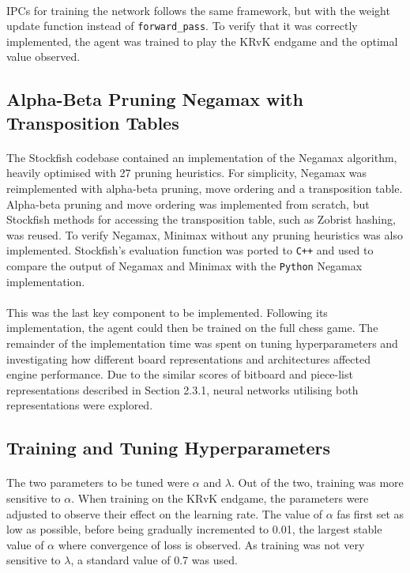 \documentclass[12pt,a4paper]{book}
\begin{document}
\paragraph{} IPCs for training the network follows the same framework, but with the weight update function instead of \texttt{forward\_pass}. To verify that it was correctly implemented, the agent was trained to play the KRvK endgame and the optimal value observed.

\subsection{Alpha-Beta Pruning Negamax with Transposition Tables}

\paragraph{} The Stockfish codebase contained an implementation of the Negamax algorithm, heavily optimised with 27 pruning heuristics. For simplicity, Negamax was reimplemented with alpha-beta pruning, move ordering and a transposition table. Alpha-beta pruning and move ordering was implemented from scratch, but Stockfish methods for accessing the transposition table, such as Zobrist hashing, was reused. To verify Negamax, Minimax without any pruning heuristics was also implemented. Stockfish's evaluation function was ported to \texttt{C++} and used to compare the output of Negamax and Minimax with the \texttt{Python} Negamax implementation.

\paragraph{} This was the last key component to be implemented. Following its implementation, the agent could then be trained on the full chess game. The remainder of the implementation time was spent on tuning hyperparameters and investigating how different board representations and architectures affected engine performance. Due to the similar scores of bitboard and piece-list representations described in Section 2.3.1, neural networks utilising both representations were explored. 

\subsection{Training and Tuning Hyperparameters}

\paragraph{} The two parameters to be tuned were $\alpha$ and $\lambda$. Out of the two, training was more sensitive to $\alpha$. When training on the KRvK endgame, the parameters were adjusted to observe their effect on the learning rate. The value of $\alpha$ fas first set as low as possible, before being gradually incremented to 0.01, the largest stable value of $\alpha$ where convergence of loss is observed. As training was not very sensitive to $\lambda$, a standard value of 0.7 was used.
\end{document}
